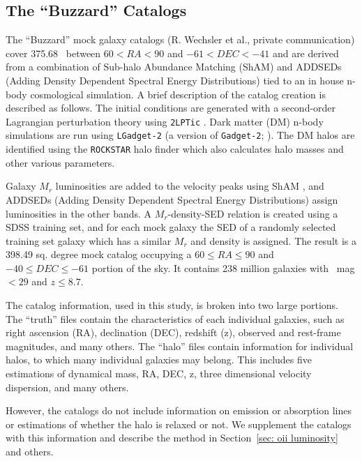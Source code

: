 \documentclass[fleqn,usenatbib]{mnras}
\begin{document}
\subsection{The ``Buzzard'' Catalogs}
The ``Buzzard'' mock galaxy catalogs (R. Wechsler et al., private communication) cover 375.68 \degsq\ between $60 < RA < 90$ and $-61 < DEC < -41$ and are derived from a combination of Sub-halo Abundance Matching (ShAM) and ADDSEDs (Adding Density Dependent Spectral Energy Distributions) tied to an in house n-body cosmological simulation. A brief description of the catalog creation is described as follows. The initial conditions are generated with a second-order Lagrangian perturbation theory using {\tt 2LPTic} \citep{Crocce2006}. Dark matter (DM) n-body simulations are run using {\tt LGadget-2} (a version of {\tt Gadget-2}; \citealt{Springel2005}). The DM halos are identified using the {\tt ROCKSTAR} halo finder \citep{Behroozi2013} which also calculates halo masses and other various parameters. 

Galaxy $M_r$ luminosities are added to the velocity peaks using ShAM \citep{Reddick2013}, and ADDSEDs (Adding Density Dependent Spectral Energy Distributions) assign luminosities in the other bands. A $M_r$-density-SED relation is created using a SDSS training set, and for each mock galaxy the SED of a randomly selected training set galaxy which has a similar $M_r$ and density is assigned. The result is a 398.49 sq. degree mock catalog occupying a $60 \leq RA \leq 90$ and $-40 \leq DEC \leq -61$ portion of the sky. It contains 238 million galaxies with \sdssr\ mag $< 29$ and $z \leq 8.7$.

The catalog information, used in this study, is broken into two large portions. The ``truth'' files contain the characteristics of each individual galaxies, such as right ascension (RA), declination (DEC), redshift (z), observed and rest-frame magnitudes, and many others. The ``halo'' files contain information for individual halos, to which many individual galaxies may belong. This includes five estimations of dynamical mass, RA, DEC, z, three dimensional velocity dispersion, and many others.

However, the catalogs do not include information on emission or absorption lines or estimations of whether the halo is relaxed or not. We supplement the catalogs with this information and describe the method in Section~\ref{sec: oii luminosity} and others.
\end{document}
